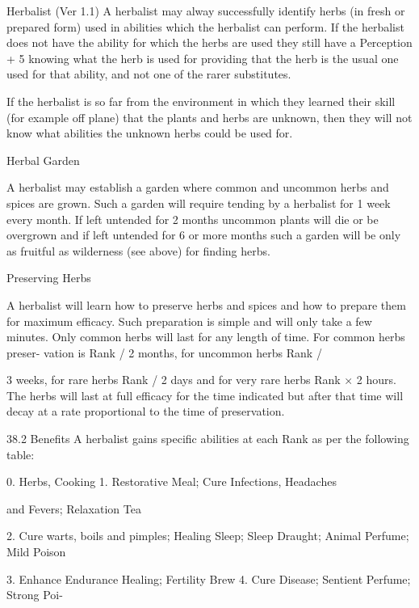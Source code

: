 \begin{Chapter}{Herbalist (Ver 1.1)}
A  herbalist  may  alway  successfully  identify  herbs 
(in  fresh  or prepared  form)  used in  abilities  which 
the herbalist  can perform.  If  the  herbalist does  not 
have  the  ability  for  which  the  herbs  are  used  they 
still  have  a  Perception  +  5%
knowing  what  the  herb  is  used  for  providing  that 
the  herb  is  the  usual  one  used  for  that  ability,  and 
not one of the rarer substitutes. 

If  the  herbalist  is  so  far  from  the  environment  in 
which  they  learned  their  skill  (for  example  off 
plane) that the plants and herbs are unknown, then 
they  will  not  know  what  abilities  the  unknown 
herbs could be used for. 

Herbal Garden 

A herbalist may establish a garden where common 
and uncommon herbs and spices are grown. Such a 
garden  will  require  tending  by  a  herbalist  for  1 
week  every  month.  If  left  untended  for  2  months 
uncommon  plants  will  die  or  be  overgrown  and  if 
left  untended  for  6  or  more  months  such  a  garden 
will  be  only  as  fruitful  as  wilderness  (see  above) 
for finding herbs. 

Preserving Herbs 

A  herbalist  will  learn  how  to  preserve  herbs  and 
spices  and  how  to  prepare  them  for  maximum 
efficacy.  Such  preparation  is  simple  and  will  only 
take  a  few  minutes.  Only  common  herbs  will  last 
for  any  length  of  time.  For  common  herbs  preser-
vation  is  Rank  /  2  months,  for  uncommon  herbs 
Rank / 

3 weeks, for rare herbs Rank / 2 days and for very 
rare  herbs  Rank  ×  2  hours.  The  herbs  will  last  at 
full  efficacy  for  the  time  indicated  but  after  that 
time will decay at a rate proportional to the time of 
preservation. 

38.2 Benefits 
A herbalist gains specific abilities at each Rank as 
per the following table: 

0.   Herbs, Cooking 
1.   Restorative Meal; Cure Infections, Headaches 

and Fevers; Relaxation Tea 

2.   Cure warts, boils and pimples; Healing Sleep; 
Sleep Draught; Animal Perfume; Mild Poison 

3.   Enhance Endurance Healing; Fertility Brew 
4.   Cure Disease; Sentient Perfume; Strong Poi-


\end{Chapter}
